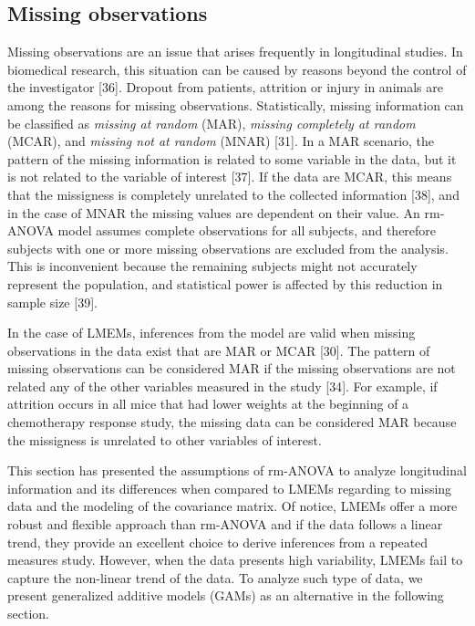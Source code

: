 \documentclass[
]{article}
\begin{document}
\hypertarget{missing-observations}{%
\subsection{Missing observations}\label{missing-observations}}

Missing observations are an issue that arises frequently in longitudinal studies. In biomedical research, this situation can be caused by reasons beyond the control of the investigator {[}36{]}. Dropout from patients, attrition or injury in animals are among the reasons for missing observations. Statistically, missing information can be classified as \emph{missing at random} (MAR), \emph{missing completely at random} (MCAR), and \emph{missing not at random} (MNAR) {[}31{]}. In a MAR scenario, the pattern of the missing information is related to some variable in the data, but it is not related to the variable of interest {[}37{]}. If the data are MCAR, this means that the missigness is completely unrelated to the collected information {[}38{]}, and in the case of MNAR the missing values are dependent on their value. An rm-ANOVA model assumes complete observations for all subjects, and therefore subjects with one or more missing observations are excluded from the analysis. This is inconvenient because the remaining subjects might not accurately represent the population, and statistical power is affected by this reduction in sample size {[}39{]}.

In the case of LMEMs, inferences from the model are valid when missing observations in the data exist that are MAR or MCAR {[}30{]}. The pattern of missing observations can be considered MAR if the missing observations are not related any of the other variables measured in the study {[}34{]}. For example, if attrition occurs in all mice that had lower weights at the beginning of a chemotherapy response study, the missing data can be considered MAR because the missigness is unrelated to other variables of interest.

This section has presented the assumptions of rm-ANOVA to analyze longitudinal information and its differences when compared to LMEMs regarding to missing data and the modeling of the covariance matrix. Of notice, LMEMs offer a more robust and flexible approach than rm-ANOVA and if the data follows a linear trend, they provide an excellent choice to derive inferences from a repeated measures study. However, when the data presents high variability, LMEMs fail to capture the non-linear trend of the data. To analyze such type of data, we present generalized additive models (GAMs) as an alternative in the following section.
\end{document}
